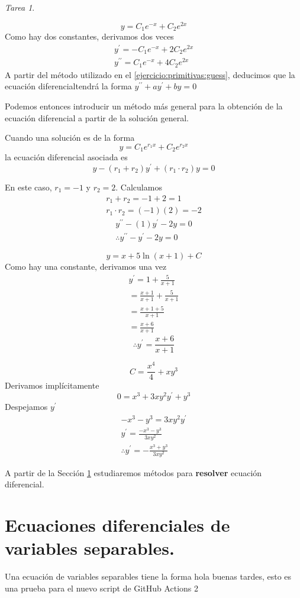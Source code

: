 \documentclass[12pt]{article} %
\theoremstyle{remark} %
\newtheorem{tarea}{Tarea}[section] %
\newcounter{ejercicio}[tarea]
\newcommand{\ed}{ecuación diferencial}
\begin{document}
\begin{tarea}
  \begin{ejercicio}[4]
    \[ y = C_1e^{-x} + C_2e^{2x} \]
    Como hay dos constantes, derivamos dos veces
    \begin{gather*}
      y^{\prime} = -C_1e^{-x} + 2C_2e^{2x}\\
      y^{\prime \prime} = C_1e^{-x} + 4C_2e^{2x}
    \end{gather*}
    A partir del método utilizado en el \cref{ejercicio:primitivas:guess}, deducimos que la \ed tendrá la forma 
    $y^{\prime \prime} + ay^{\prime} + by = 0$

    Podemos entonces introducir un método más general para la obtención de la ecuación diferencial a partir 
    de la solución general.

    Cuando una solución es de la forma \[ y = C_1e^{r_1x} + C_2e^{r_2x} \]
    la ecuación diferencial asociada es \[ y - (r_1 + r_2)y^{\prime} + (r_1 \cdot r_2)y = 0 \]

    En este caso, $r_1 = -1$ y $r_2 = 2$. Calculamos 
    \begin{gather*}
      r_1 + r_2 = -1 + 2 = 1\\
      r_1 \cdot r_2 = (-1)(2) = -2
    \end{gather*}
    \begin{gather*}
      y^{\prime \prime} -(1)y^{\prime} -2y = 0\\
      \therefore y^{\prime \prime} - y^{\prime} - 2y = 0
    \end{gather*}
  \end{ejercicio}
  \begin{ejercicio}[7]
    \[ y = x + 5 \ln(x+1) + C \]
    Como hay una constante, derivamos una vez
    \begin{gather*}
      y^{\prime} = 1 + \frac{5}{x+1}\\[0.5em]
      = \frac{x+1}{x+1} + \frac{5}{x+1}\\[0.5em]
      = \frac{x+1+5}{x+1}\\[0.5em]
      = \frac{x+6}{x+1}
    \end{gather*}
    \[ \therefore y^{\prime} = \frac{x+6}{x+1} \]
  \end{ejercicio}
  \begin{ejercicio}[9]
    \[ C = \frac{x^4}{4} + xy^{3} \]
    Derivamos implícitamente \[ 0 = x^3 + 3xy^2y^{\prime} + y^3 \]
    Despejamos $y^{\prime}$
    \begin{gather*}
      -x^3 - y^3 = 3xy^2y^{\prime}\\[0.5em]
      y^{\prime} = \frac{-x^3-y^3}{3xy^2}\\[0.5em]
      \therefore y^{\prime} = - \frac{x^3 + y^3}{3xy^2}
    \end{gather*}
  \end{ejercicio}
\end{tarea}
A partir de la Sección \ref{sec:variablesSeparables} estudiaremos métodos para \textbf{resolver} \ed .

\section{Ecuaciones diferenciales de variables separables.}
\label{sec:variablesSeparables}
Una ecuación de variables separables tiene la forma hola buenas tardes, esto es una prueba para el 
nuevo script de GitHub Actions 2
\end{document}
